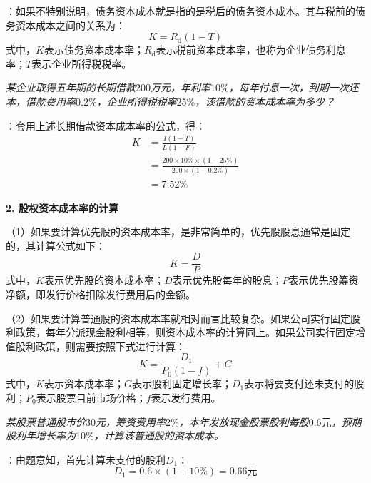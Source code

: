 \documentclass[
  10pt,
  twoside,
  openany,
  b5paper, %
  colorscheme = black, %
  xits = false,
]{qyxf-book}
\begin{document}
\analysis[注]：如果不特别说明，债务资本成本就是指的是税后的债务资本成本。其与税前的债务资本成本之间的关系为：
\begin{equation*}
	K = R_\mathrm{d}(1-T)
\end{equation*}
式中，$K$表示债务资本成本率；$R_\mathrm{d}$表示税前资本成本率，也称为企业债务利息率；$T$表示企业所得税税率。

\emph{某企业取得五年期的长期借款}200\emph{万元，年利率}10\%\emph{，每年付息一次，到期一次还本，借款费用率}0.2\%\emph{，企业所得税税率}25\%\emph{，该借款的资本成本率为多少？}

\solve[答]：套用上述长期借款资本成本率的公式，得：
\begin{equation*}
	\begin{aligned}
		K &= \frac{I(1-T)}{L(1-F)} \\[1.5ex]
		&= \frac{200 \times 10\% \times (1-25\%)}{200 \times (1-0.2\%)} \\[1.5ex]
		&=7.52\%
	\end{aligned}
\end{equation*}

\textbf{2. 股权资本成本率的计算}

（1）如果要计算优先股的资本成本率，是非常简单的，优先股股息通常是固定的，其计算公式如下：
\begin{equation*}
	K = \frac{D}{P}
\end{equation*}
式中，$K$表示优先股的资本成本率；$D$表示优先股每年的股息；$P$表示优先股筹资净额，即发行价格扣除发行费用后的金额。

（2）如果要计算普通股的资本成本率就相对而言比较复杂。如果公司实行固定股利政策，每年分派现金股利相等，则资本成本率的计算同上。如果公司实行固定增值股利政策，则需要按照下式进行计算：
\begin{equation*}
	K = \frac{D_1}{P_0(1-f)}+G
\end{equation*}
式中，$K$表示资本成本率；$G$表示股利固定增长率；$D_1$表示将要支付还未支付的股利；$P_0$表示股票目前市场价格；$f$表示发行费用。

\emph{某股票普通股市价}30\emph{元，筹资费用率}2\%\emph{，本年发放现金股票股利每股}0.6元\emph{，预期股利年增长率为}10\%\emph{，计算该普通股的资本成本。}

\solve[答]：由题意知，首先计算未支付的股利$D_1$：
\begin{equation*}
	D_1 = 0.6 \times (1+10\%) = 0.66\text{元}
\end{equation*}
\end{document}
